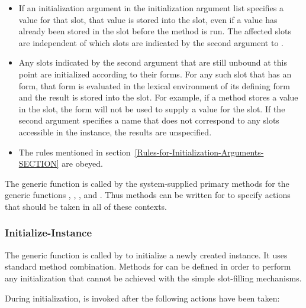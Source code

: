 \begin{itemize}

\item  If an initialization argument in the initialization
argument list specifies a value for that slot, that value is stored
into the slot, even if a value has already been stored in the slot
before the method is run.  The affected slots are independent of which
slots are indicated by the second argument to .

\item  Any slots indicated by the second argument that are still
unbound at this point are initialized according to their 
 forms.  For any such slot that has an  form,
that form is evaluated in the lexical environment of its defining 
 form and the result is stored into the slot.  For example,
if a  method stores a value in the slot, the 
 form will not be used to supply a value for the slot.  If
the second argument specifies a name that does not correspond to any
slots accessible in the instance, the results are unspecified.

\item  The rules mentioned in section~\ref{Rules-for-Initialization-Arguments-SECTION} are obeyed.

\end{itemize}

The generic function  is called by the
system-supplied primary methods for the generic functions
,
, 
, and
.
Thus methods can be written for 
 to specify actions that should be taken in all of
these contexts.


\subsubsection{Initialize-Instance}

The generic function  is called by 
 to initialize a newly created instance.  It uses
standard method combination.  Methods for 
 can be defined in order to perform any
initialization that cannot be achieved with the simple slot-filling
mechanisms.


During initialization,  is invoked
after the following actions have been taken:

